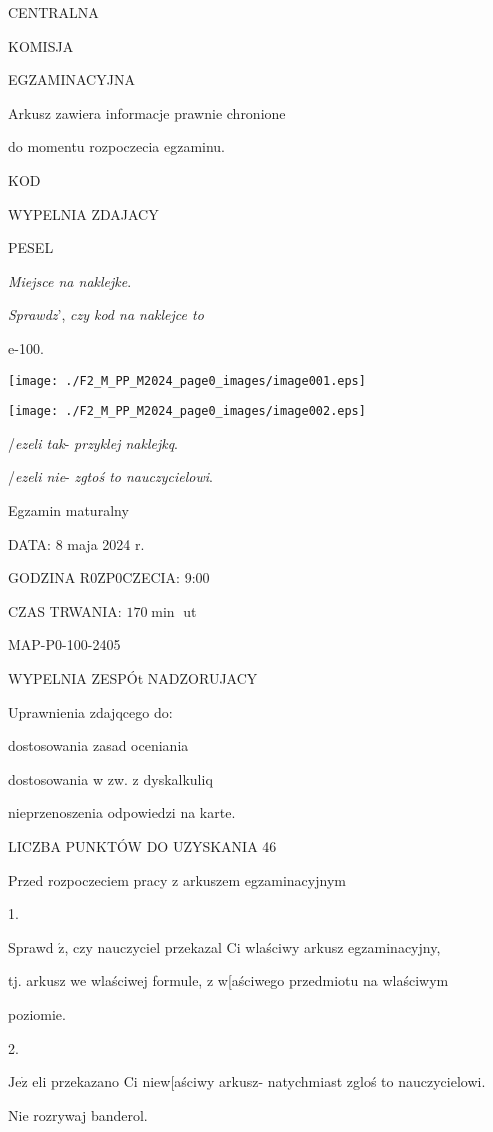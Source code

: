 \documentclass[a4paper,12pt]{article}
\begin{document}
CENTRALNA

KOMISJA

EGZAMINACYJNA

Arkusz zawiera informacje prawnie chronione

do momentu rozpoczecia egzaminu.

KOD

WYPELNIA ZDAJACY

PESEL

{\it Miejsce na naklejke}.

{\it Sprawdz}', {\it czy kod na naklejce to}

e-100.
\begin{center}
\texttt{[image: ./F2\_M\_PP\_M2024\_page0\_images/image001.eps]}

\texttt{[image: ./F2\_M\_PP\_M2024\_page0\_images/image002.eps]}
\end{center}
/{\it ezeli tak}- {\it przyklej naklejkq}.

/{\it ezeli nie}- {\it zgtoś to nauczycielowi}.

Egzamin maturalny

DATA: 8 maja 2024 r.

GODZINA R0ZP0CZECIA: 9:00

CZAS TRWANIA: $170 \displaystyle \min$ ut

MAP-P0-100-2405

WYPELNIA ZESPÓt NADZORUJACY

Uprawnienia zdajqcego do:

\fbox{} dostosowania zasad oceniania

\fbox{} dostosowania w zw. z dyskalkuliq

\fbox{} nieprzenoszenia odpowiedzi na karte.

LICZBA PUNKTÓW DO UZYSKANIA 46

Przed rozpoczeciem pracy z arkuszem egzaminacyjnym

1.

Sprawd $\acute{\mathrm{z}}$, czy nauczyciel przekazal Ci wlaściwy arkusz egzaminacyjny,

tj. arkusz we wlaściwej formule, z w[aściwego przedmiotu na wlaściwym

poziomie.

2.

$\mathrm{J}\mathrm{e}\dot{\mathrm{z}}$ eli przekazano Ci niew[aściwy arkusz- natychmiast zgloś to nauczycielowi.

Nie rozrywaj banderol.
\end{document}
